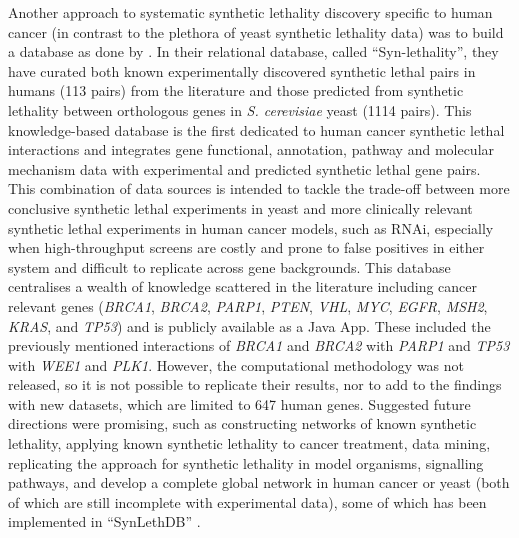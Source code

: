 Another approach to systematic synthetic lethality discovery specific to human cancer (in contrast to the plethora of yeast synthetic lethality data) was to build a database as done by \citet{Li2014}. In their relational database, called ``Syn-lethality'', they have curated both known experimentally discovered synthetic lethal pairs in humans (113 pairs) from the literature and those predicted from synthetic lethality between orthologous genes in \textit{S. cerevisiae} yeast (1114 pairs). This knowledge-based database is the first dedicated to human cancer synthetic lethal interactions and integrates gene functional, annotation, pathway and molecular mechanism data with experimental and predicted synthetic lethal gene pairs. This combination of data sources is intended to tackle the trade-off between more conclusive synthetic lethal experiments in yeast and more clinically relevant synthetic lethal experiments in human cancer models, such as RNAi, especially when high-throughput screens are costly and prone to false positives in either system and difficult to replicate across gene backgrounds. This database centralises a wealth of knowledge scattered in the literature including cancer relevant genes (\textit{BRCA1}, \textit{BRCA2}, \textit{PARP1}, \textit{PTEN}, \textit{VHL}, \textit{MYC}, \textit{EGFR}, \textit{MSH2}, \textit{KRAS}, and \textit{TP53}) and is publicly available as a Java App. These included the previously mentioned interactions of \textit{BRCA1} and \textit{BRCA2} with \textit{PARP1} and \textit{TP53} with \textit{WEE1} and \textit{PLK1}. However, the computational methodology was not released, so it is not possible to replicate their results, nor to add to the findings with new datasets, which are limited to 647 human genes. Suggested future directions were promising, such as constructing networks of known synthetic lethality, applying known synthetic lethality to cancer treatment, data mining, replicating the approach for synthetic lethality in model organisms, signalling pathways, and develop a complete global network in human cancer or yeast (both of which are still incomplete with experimental data), some of which has been implemented in ``SynLethDB'' \citep{Guo2016}.  


